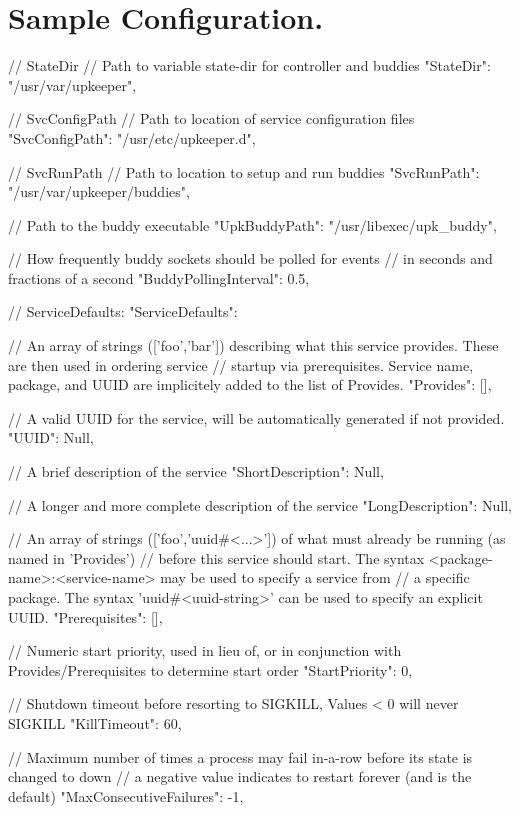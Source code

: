 \section{Sample Configuration.}\label{index_sampleconfig}
\begin{DoxyVerb}
{
    // StateDir
    // Path to variable state-dir for controller and buddies
    "StateDir": "/usr/var/upkeeper",

    // SvcConfigPath
    // Path to location of service configuration files
    "SvcConfigPath": "/usr/etc/upkeeper.d",

    // SvcRunPath
    // Path to location to setup and run buddies
    "SvcRunPath": "/usr/var/upkeeper/buddies",

    // Path to the buddy executable
    "UpkBuddyPath": "/usr/libexec/upk_buddy",

    // How frequently buddy sockets should be polled for events
    // in seconds and fractions of a second
    "BuddyPollingInterval": 0.5,

    // ServiceDefaults:
    "ServiceDefaults": {
        // An array of strings (['foo','bar']) describing what this service provides. These are then used in ordering service
        // startup via prerequisites. Service name, package, and UUID are implicitely added to the list of Provides.
        "Provides": [],

        // A valid UUID for the service, will be automatically generated if not provided.
        "UUID": Null,

        // A brief description of the service
        "ShortDescription": Null,

        // A longer and more complete description of the service
        "LongDescription": Null,

        // An array of strings (['foo','uuid#<...>']) of what must already be running (as named in 'Provides')
        // before this service should start. The syntax <package-name>:<service-name> may be used to specify a service from
        // a specific package. The syntax 'uuid#<uuid-string>' can be used to specify an explicit UUID.
        "Prerequisites": [],

        // Numeric start priority, used in lieu of, or in conjunction with Provides/Prerequisites to determine start order
        "StartPriority": 0,

        // Shutdown timeout before resorting to SIGKILL, Values < 0 will never SIGKILL
        "KillTimeout": 60,

        // Maximum number of times a process may fail in-a-row before its state is changed to down
        // a negative value indicates to restart forever (and is the default)
        "MaxConsecutiveFailures": -1,

}}
\end{DoxyVerb}

